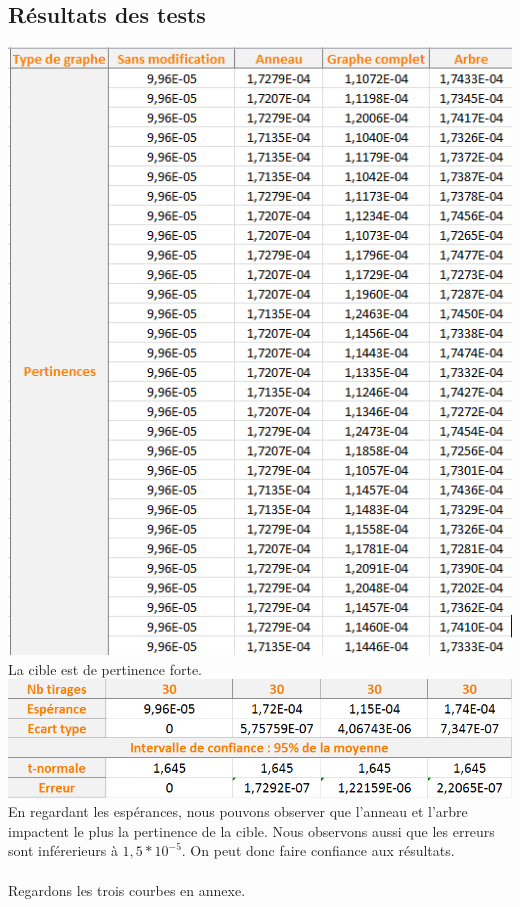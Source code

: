 \documentclass[a4paper,11pt]{article}
\begin{document}
	\subsection{Résultats des tests}
		\includegraphics[scale = 0.5]{Captures/ranking2.PNG}\\
		La cible est de pertinence forte. \\
		\includegraphics[scale = 0.5]{Captures/ranking3.PNG}\\
		En regardant les espérances, nous pouvons observer que l'anneau et l'arbre impactent le plus la pertinence de la cible. Nous observons aussi que les erreurs sont inférerieurs à $1,5*10^{-5}$. On peut donc faire confiance aux résultats.\\
		\\
		Regardons les trois courbes en annexe.\\
\end{document}
